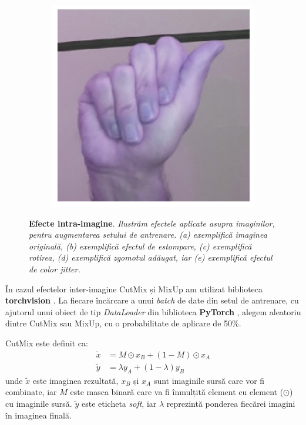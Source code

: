 \begin{figure}[H]
\begin{subfigure}{0.18\textwidth}
      \caption{}
    \end{subfigure}
    \hspace{0.005\textwidth}
    \begin{subfigure}{0.18\textwidth}
      \includegraphics[width=\linewidth]{images/2-recunoasterea-asl/imagine_a_color_jitter.png}
      \caption{}
    \end{subfigure}

  \caption[Efecte intra-imagine]{\textbf{Efecte intra-imagine}. \textit{Ilustrăm efectele aplicate asupra imaginilor, pentru augmentarea setului de antrenare. (a) exemplifică imaginea originală, (b) exemplifică efectul de estompare, (c) exemplifică rotirea, (d) exemplifică zgomotul adăugat, iar (e) exemplifică efectul de color jitter.}}
  \label{fig:exemplu_efecte_clasice}
\end{figure}

În cazul efectelor inter-imagine CutMix și MixUp am utilizat biblioteca \textbf{torchvision} \cite{torchvision2016}. La fiecare încărcare a unui \textit{batch} de date din setul de antrenare, cu ajutorul unui obiect de tip \textit{DataLoader} din biblioteca \textbf{PyTorch} \cite{pytorch}, alegem aleatoriu dintre CutMix sau MixUp, cu o probabilitate de aplicare de 50\%. 

CutMix este definit ca:
\begin{equation}
    \begin{aligned}
        \tilde{x} &= M \odot x_B + (1 - M) \odot x_A \\
        \tilde{y} &= \lambda y_A + (1 - \lambda) y_B
    \end{aligned}
    \label{eq:cutmix}
\end{equation}
unde $\tilde{x}$ este imaginea rezultată, $x_B$ și $x_A$ sunt imaginile sursă care vor fi combinate, iar $M$ este masca binară care va fi înmulțită element cu element ($\odot$) cu imaginile sursă. $\tilde{y}$ este eticheta \textit{soft}, iar $\lambda$ reprezintă ponderea fiecărei imagini în imaginea finală.

